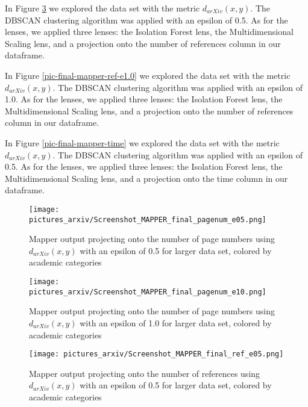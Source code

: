 \documentclass[12pt]{article}
\theoremstyle{definition}
\begin{document}
In Figure \ref{pic-final-mapper-ref-e0.5} we explored the data set with the metric $d_{arXiv}(x,y)$. The DBSCAN clustering algorithm was applied with an epsilon of 0.5. As for the lenses, we applied three lenses: the Isolation Forest lens, the Multidimensional Scaling lens, and a projection onto the number of references column in our dataframe. 

In Figure \ref{pic-final-mapper-ref-e1.0} we explored the data set with the metric $d_{arXiv}(x,y)$. The DBSCAN clustering algorithm was applied with an epsilon of 1.0. As for the lenses, we applied three lenses: the Isolation Forest lens, the Multidimensional Scaling lens, and a projection onto the number of references column in our dataframe. 

In Figure \ref{pic-final-mapper-time} we explored the data set with the metric $d_{arXiv}(x,y)$. The DBSCAN clustering algorithm was applied with an epsilon of 0.5. As for the lenses, we applied three lenses: the Isolation Forest lens, the Multidimensional Scaling lens, and a projection onto the time column in our dataframe. 

\begin{figure}[H]
\begin{center}
\texttt{[image: pictures\_arxiv/Screenshot\_MAPPER\_final\_pagenum\_e05.png]}
\end{center}
\caption{Mapper output projecting onto the number of page numbers using $d_{arXiv}(x,y)$ with an epsilon of 0.5 for larger data set, colored by academic categories}
\label{pic-final-mapper-pagenum-e0.5}
\end{figure}

\begin{figure}[H]
\begin{center}
\texttt{[image: pictures\_arxiv/Screenshot\_MAPPER\_final\_pagenum\_e10.png]}
\end{center}
\caption{Mapper output projecting onto the number of page numbers using $d_{arXiv}(x,y)$ with an epsilon of 1.0 for larger data set, colored by academic categories}
\label{pic-final-mapper-pagenum-e1.0}
\end{figure}

\begin{figure}[H]
\begin{center}
\texttt{[image: pictures\_arxiv/Screenshot\_MAPPER\_final\_ref\_e05.png]}
\end{center}
\caption{Mapper output projecting onto the number of references using $d_{arXiv}(x,y)$ with an epsilon of 0.5 for larger data set, colored by academic categories}
\label{pic-final-mapper-ref-e0.5}
\end{figure}
\end{document}
